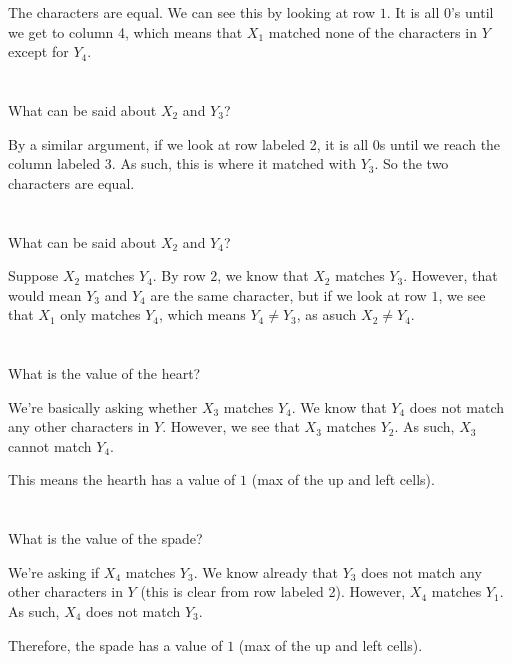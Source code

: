 \documentclass [12pt]{article}
\begin{document}
\begin{Solution}
The characters are equal. We can see this by looking at row $1$. It is all $0$'s until we get to column 4, which means that $X_1$ matched none of the characters in $Y$ except for $Y_4$.
\end{Solution}


\section{} What can be said about $X_2 $ and $Y_3$?

\begin{Solution}
By a similar argument, if we look at row labeled 2, it is all 0s until we reach the column labeled 3. As such, this is where it matched with $Y_3$. So the two characters are equal.
\end{Solution}


\section{} What can be said about $X_2$ and $Y_4$?

\begin{Solution}
Suppose $X_2$ matches $Y_4$. By row $2$, we know that $X_2$ matches $Y_3$. However, that would mean $Y_3$ and $Y_4$ are the same character, but if we look at row $1$, we see that $X_1$ only matches $Y_4$, which means $Y_4 \neq Y_3$, as asuch $X_2 \neq Y_4$.
\end{Solution}


\section{} What is the value of the heart?

\begin{Solution}
We're basically asking whether $X_3$ matches $Y_4$. We know that $Y_4$ does not match any other characters in $Y$. However, we see that $X_3$ matches $Y_2$. As such, $X_3$ cannot match $Y_4$.

This means the hearth has a value of $1$ (max of the up and left cells).
\end{Solution}


\section{} What is the value of the spade?
\begin{Solution}
We're asking if $X_4$ matches $Y_3$. We know already that $Y_3$ does not match any other characters in $Y$ (this is clear from row labeled 2). However, $X_4$ matches $Y_1$. As such, $X_4$ does not match $Y_3$.

Therefore, the spade has a value of $1$ (max of the up and left cells).
\end{Solution}
\end{document}

